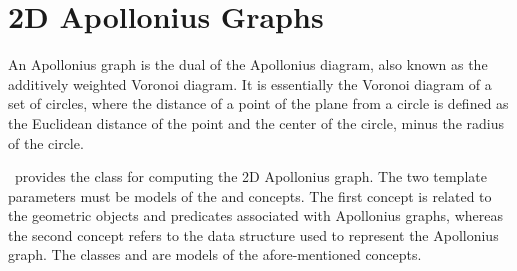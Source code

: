 
\chapter{2D Apollonius Graphs}
\label{ref-chapter-apollonius2}


An Apollonius graph is the dual of the Apollonius diagram, also known
as the additively weighted Voronoi diagram. It is essentially the
Voronoi diagram of a set of circles, where the distance of a
point of the plane from a circle is defined as the Euclidean
distance of the point and the center of the circle, minus the radius
of the circle.

\cgal\ provides the class  for
computing the 2D Apollonius graph. The two template parameters must be
models of the  and
 concepts. The first concept is
related to the geometric objects and predicates associated with
Apollonius graphs, whereas the second concept refers to the data
structure used to represent the Apollonius graph. The classes
 and
 are models of the
afore-mentioned concepts.


 \\
 \\
 \\
 \\


\\
\\
\\
\\
\\

